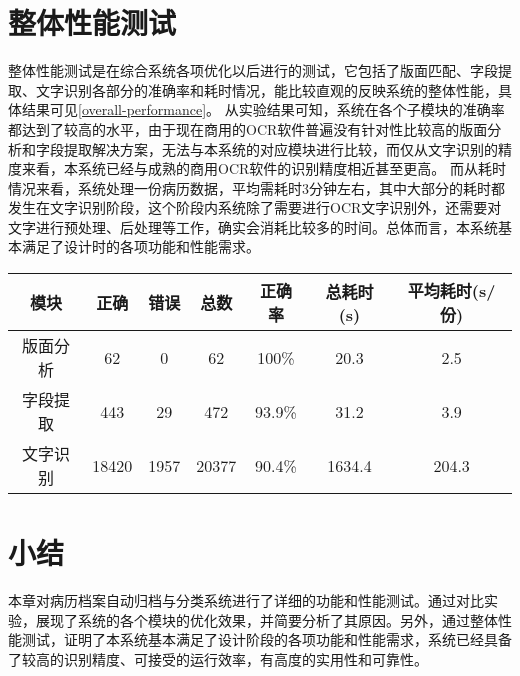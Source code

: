 \section{整体性能测试}
整体性能测试是在综合系统各项优化以后进行的测试，它包括了版面匹配、字段提取、文字识别各部分的准确率和耗时情况，能比较直观的反映系统的整体性能，具体结果可见\autoref{overall-performance}。
从实验结果可知，系统在各个子模块的准确率都达到了较高的水平，由于现在商用的OCR软件普遍没有针对性比较高的版面分析和字段提取解决方案，无法与本系统的对应模块进行比较，而仅从文字识别的精度来看，本系统已经与成熟的商用OCR软件的识别精度相近甚至更高。
而从耗时情况来看，系统处理一份病历数据，平均需耗时3分钟左右，其中大部分的耗时都发生在文字识别阶段，这个阶段内系统除了需要进行OCR文字识别外，还需要对文字进行预处理、后处理等工作，确实会消耗比较多的时间。总体而言，本系统基本满足了设计时的各项功能和性能需求。
\begin{table}[!htbp]
	\label{overall-performance}
	\centering
	\vspace{10pt}
  \renewcommand\arraystretch{1.5}  %
	\begin{tabular}{c|c|c|c|c|c|c}
    \hline
    模块 & 正确 & 错误 & 总数 & 正确率 & 总耗时(s) & 平均耗时(s/份) \\
    \hline
    版面分析 & 62 & 0 & 62 & 100\% & 20.3 & 2.5 \\
    \hline
    字段提取 & 443 & 29 & 472 & 93.9\% & 31.2 & 3.9 \\
    \hline
    文字识别 & 18420 & 1957 & 20377 & 90.4\% & 1634.4 & 204.3 \\
    \hline
	\end{tabular}
\end{table}

\section{小结}
本章对病历档案自动归档与分类系统进行了详细的功能和性能测试。通过对比实验，展现了系统的各个模块的优化效果，并简要分析了其原因。另外，通过整体性能测试，证明了本系统基本满足了设计阶段的各项功能和性能需求，系统已经具备了较高的识别精度、可接受的运行效率，有高度的实用性和可靠性。
